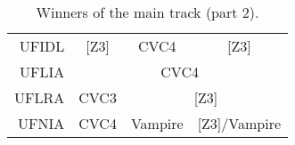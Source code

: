\begin{table}[]
\begin{center}
{\begin{tabular}{rcccc}
\multicolumn{1}{r|}{UFIDL}      & \multicolumn{1}{c|}{{[}Z3{]}} & \multicolumn{2}{c|}{CVC4}                                           & \multicolumn{1}{c|}{{[}Z3{]}}         \\ \cline{2-5} 
\multicolumn{1}{r|}{UFLIA}      & \multicolumn{4}{c|}{CVC4}                                                                                                                   \\ \cline{2-5} 
\multicolumn{1}{r|}{UFLRA}      & \multicolumn{1}{c|}{CVC3}     & \multicolumn{3}{c|}{{[}Z3{]}}                                                                               \\ \cline{2-5} 
\multicolumn{1}{r|}{UFNIA}      & \multicolumn{1}{c|}{CVC4}     & \multicolumn{2}{c|}{Vampire}                                        & \multicolumn{1}{c|}{{[}Z3{]}/Vampire} \\ \cline{2-5} 
\end{tabular}}
\end{center}
\caption{\label{tab:winners-main-2} Winners of the main track (part 2).}
\end{table}
